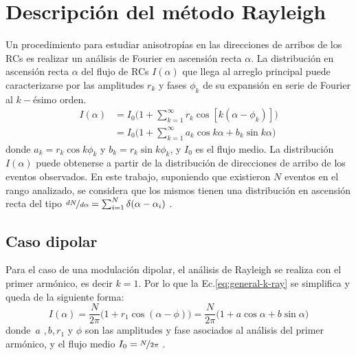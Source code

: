   \section{Descripción del método Rayleigh}
  Un procedimiento para estudiar anisotropías en las direcciones de arribos de los RCs es realizar un análisis de Fourier en ascensión recta $\alpha$. La distribución en ascensión recta $\alpha$ del flujo de RCs $I(\alpha)$ que llega al arreglo principal puede caracterizarse por las amplitudes $r_k$ y fases $\phi_k$ de su expansión en serie de Fourier al $k-$ésimo orden. 
  \begin{align}
    I(\alpha) &= I_0 \bigg ( 1+ \sum^\infty_{k=1} r_k\cos{[k(\alpha - \phi_k)]} \bigg) \\
              &= I_0 \bigg ( 1+ \sum^\infty_{k=1} a_k\cos{k\alpha} +  b_k\sin{k\alpha} \bigg ) \label{eq:general-k-ray}
  \end{align}
  donde $a_k=r_k\cos k\phi_k$ y $b_k=r_k\sin k \phi_k$, y $I_0$ es el flujo medio. La distribución $I(\alpha)$ puede obtenerse a partir de la distribución de direcciones de arribo de los eventos observados.  En este trabajo, suponiendo que existieron $N$ eventos en el rango analizado, se considera que los mismos tienen una distribución en ascensión recta del tipo $\nicefrac{dN}{d\alpha}= \sum^N_{i=1} \delta(\alpha - \alpha_i)$ \cite{taborda}. 

  \subsection{Caso dipolar} \label{caso_dipolar}
  {Para el caso de una modulación dipolar, el análisis de Rayleigh se realiza con el primer armónico, es decir $k=1$. Por lo que la Ec.\ref{eq:general-k-ray} se simplifica y queda de la siguiente forma:}
  \begin{equation}
    I(\alpha) = \frac{N}{2\pi} \bigg ( 1+ r_1\cos{(\alpha - \phi)} \bigg) = \frac{N}{2\pi}\bigg ( 1+ a\cos{\alpha} +  b\sin{\alpha} \bigg ) \label{eq:general-1-ray}
  \end{equation}
  donde $\, a$ ,$\, b$,$\, r_1$ y $\phi$ son las amplitudes y fase asociados al análisis del primer armónico, y el flujo medio $I_0=\nicefrac{N}{2\pi}$ \cite{taborda}.

  

